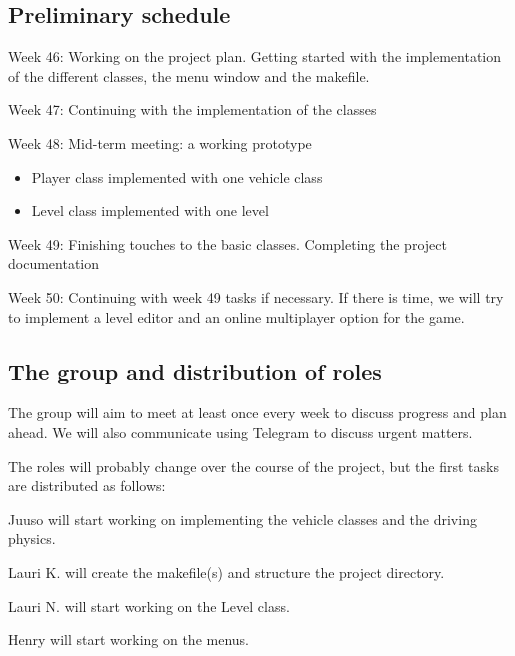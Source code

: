 \documentclass{article}
\begin{document}
\subsection*{Preliminary schedule}
Week 46: Working on the project plan. Getting started with the implementation of the different classes, the menu window and the makefile.

Week 47: Continuing with the implementation of the classes

Week 48: Mid-term meeting: a working prototype
\begin{itemize}
\item Player class implemented with one vehicle class
\item Level class implemented with one level
\end{itemize}

Week 49: Finishing touches to the basic classes. Completing the project documentation

Week 50: Continuing with week 49 tasks if necessary. If there is time, we will try to implement a level editor and an online multiplayer option for the game.

\subsection*{The group and distribution of roles}
The group will aim to meet at least once every week to discuss progress and plan ahead. We will also communicate using Telegram to discuss urgent matters.

The roles will probably change over the course of the project, but the first tasks are distributed as follows:

Juuso will start working on implementing the vehicle classes and the driving physics.

Lauri K. will create the makefile(s) and structure the project directory.

Lauri N. will start working on the Level class.

Henry will start working on the menus.
\end{document}
